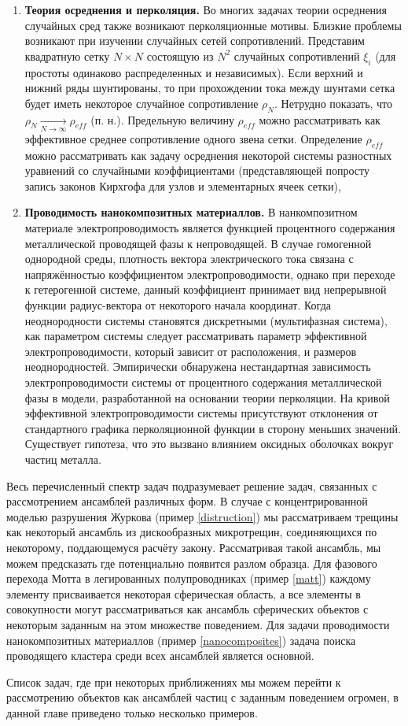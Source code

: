 \begin{enumerate}
    \item \label{averaging}
    \textbf{Теория осреднения и перколяция.} \newline
        Во многих задачах теории осреднения случайных сред также возникают перколяционные мотивы. Близкие проблемы возникают при изучении случайных сетей сопротивлений. Представим квадратную сетку $N \times N$ состоящую из $N^2$ случайных сопротивлений $\xi_{i}$ (для простоты одинаково распределенных и независимых). Если верхний и нижний ряды шунтированы, то при прохождении тока между шунтами сетка будет иметь некоторое случайное сопротивление $\rho_{N}$. Нетрудно показать, что $\rho_{N}\xrightarrow[N\rightarrow\infty]{}\rho_{eff}$ (п. н.). Предельную величину $\rho_{eff}$ можно рассматривать как эффективное среднее сопротивление одного звена сетки. Определение $\rho_{eff}$ можно рассматривать как задачу осреднения некоторой системы разностных уравнений со случайными коэффициентами (представляющей попросту запись законов Кирхгофа для узлов и элементарных ячеек сетки),
    \item \label{nanocomposites}
    \textbf{Проводимость нанокомпозитных материаллов.}
        В нанкомпозитном материале электропроводимость является функцией процентного содержания металлической проводящей фазы к непроводящей. В случае гомогенной однородной среды, плотность вектора электрического тока связана с напряжённостью коэффициентом электропроводимости, однако при переходе к гетерогенной системе, данный коэффициент принимает вид непрерывной функции радиус-вектора от некоторого начала координат. Когда неоднородности системы становятся дискретными (мультифазная система), как параметром системы следует рассматривать параметр эффективной электропроводимости, который зависит от расположения, и размеров неоднородностей. Эмпирически обнаружена нестандартная зависимость электропроводимости системы от процентного содержания металлической фазы в модели, разработанной на основании теории перколяции. На кривой эффективной электропроводимости системы присутствуют отклонения от стандартного графика перколяционной функции в сторону меньших значений. Существует гипотеза, что это вызвано влиянием оксидных оболочках вокруг частиц металла.
\end{enumerate}

Весь перечисленный спектр задач подразумевает решение задач, связанных с рассмотрением ансамблей различных форм. В случае с концентрированной моделью разрушения Журкова (пример \ref{distruction}) мы рассматриваем трещины как некоторый ансамбль из дискообразных микротрещин, соединяющихся по некоторому, поддающемуся расчёту закону. Рассматривая такой ансамбль, мы можем предсказать где потенциально появится разлом образца. Для фазового перехода Мотта в легированных полупроводниках (пример \ref{matt}) каждому элементу присваивается некоторая сферическая область, а все элементы в совокупности могут рассматриваться как ансамбль сферических объектов с некоторым заданным на этом множестве поведением. Для задачи проводимости нанокомпозитных материаллов (пример \ref{nanocomposites}) задача поиска проводящего кластера среди всех ансамблей является основной. 

Список задач, где при некоторых приближениях мы можем перейти к рассмотрению объектов как ансамблей частиц с заданным поведением огромен, в данной главе приведено только несколько примеров.  